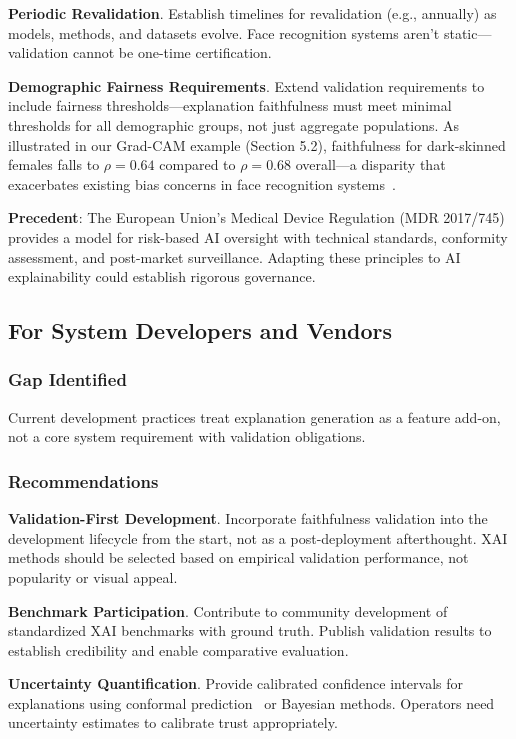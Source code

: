 \textbf{Periodic Revalidation}. Establish timelines for revalidation (e.g., annually) as models, methods, and datasets evolve. Face recognition systems aren't static—validation cannot be one-time certification.

\textbf{Demographic Fairness Requirements}. Extend validation requirements to include fairness thresholds—explanation faithfulness must meet minimal thresholds for all demographic groups, not just aggregate populations. As illustrated in our Grad-CAM example (Section 5.2), faithfulness for dark-skinned females falls to $\rho = 0.64$ compared to $\rho = 0.68$ overall—a disparity that exacerbates existing bias concerns in face recognition systems~\cite{grother2019frvt}.

\textbf{Precedent}: The European Union's Medical Device Regulation (MDR 2017/745)~\cite{mdr2017} provides a model for risk-based AI oversight with technical standards, conformity assessment, and post-market surveillance. Adapting these principles to AI explainability could establish rigorous governance.

\subsection{For System Developers and Vendors}

\subsubsection{Gap Identified}

Current development practices treat explanation generation as a feature add-on, not a core system requirement with validation obligations.

\subsubsection{Recommendations}

\textbf{Validation-First Development}. Incorporate faithfulness validation into the development lifecycle from the start, not as a post-deployment afterthought. XAI methods should be selected based on empirical validation performance, not popularity or visual appeal.

\textbf{Benchmark Participation}. Contribute to community development of standardized XAI benchmarks with ground truth. Publish validation results to establish credibility and enable comparative evaluation.

\textbf{Uncertainty Quantification}. Provide calibrated confidence intervals for explanations using conformal prediction~\cite{vovk2005conformal} or Bayesian methods. Operators need uncertainty estimates to calibrate trust appropriately.

